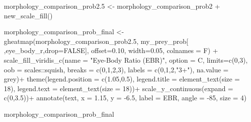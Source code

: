 \documentclass[
]{article}
\newenvironment{Shaded}{\begin{snugshade}}{\end{snugshade}}
\newcommand{\AttributeTok}[1]{\textcolor[rgb]{0.77,0.63,0.00}{#1}}
\newcommand{\ConstantTok}[1]{\textcolor[rgb]{0.00,0.00,0.00}{#1}}
\newcommand{\DecValTok}[1]{\textcolor[rgb]{0.00,0.00,0.81}{#1}}
\newcommand{\FloatTok}[1]{\textcolor[rgb]{0.00,0.00,0.81}{#1}}
\newcommand{\FunctionTok}[1]{\textcolor[rgb]{0.00,0.00,0.00}{#1}}
\newcommand{\NormalTok}[1]{#1}
\newcommand{\OtherTok}[1]{\textcolor[rgb]{0.56,0.35,0.01}{#1}}
\newcommand{\SpecialCharTok}[1]{\textcolor[rgb]{0.00,0.00,0.00}{#1}}
\newcommand{\StringTok}[1]{\textcolor[rgb]{0.31,0.60,0.02}{#1}}
\begin{document}
\begin{Shaded}
\begin{Highlighting}[]
\NormalTok{morphology\_comparison\_prob2}\FloatTok{.5} \OtherTok{\textless{}{-}}\NormalTok{ morphology\_comparison\_prob2 }\SpecialCharTok{+} \FunctionTok{new\_scale\_fill}\NormalTok{()}

\NormalTok{morphology\_comparison\_prob\_final }\OtherTok{\textless{}{-}} \FunctionTok{gheatmap}\NormalTok{(morphology\_comparison\_prob2}\FloatTok{.5}\NormalTok{, }
\NormalTok{                                             my\_prey\_prob[ ,}\StringTok{\textquotesingle{}eye\_body\_r\textquotesingle{}}\NormalTok{,}\AttributeTok{drop=}\ConstantTok{FALSE}\NormalTok{], }
                                             \AttributeTok{offset=}\FloatTok{0.10}\NormalTok{, }\AttributeTok{width=}\FloatTok{0.05}\NormalTok{, }\AttributeTok{colnames =}\NormalTok{ F) }\SpecialCharTok{+}
  \FunctionTok{scale\_fill\_viridis\_c}\NormalTok{(}\AttributeTok{name =} \StringTok{"Eye{-}Body Ratio (EBR)"}\NormalTok{, }
                       \AttributeTok{option =} \StringTok{\textquotesingle{}C\textquotesingle{}}\NormalTok{,}
                       \AttributeTok{limits=}\FunctionTok{c}\NormalTok{(}\DecValTok{0}\NormalTok{,}\DecValTok{3}\NormalTok{), }
                       \AttributeTok{oob =}\NormalTok{ scales}\SpecialCharTok{::}\NormalTok{squish, }
                       \AttributeTok{breaks =} \FunctionTok{c}\NormalTok{(}\DecValTok{0}\NormalTok{,}\DecValTok{1}\NormalTok{,}\DecValTok{2}\NormalTok{,}\DecValTok{3}\NormalTok{),}
                       \AttributeTok{labels =} \FunctionTok{c}\NormalTok{(}\DecValTok{0}\NormalTok{,}\DecValTok{1}\NormalTok{,}\DecValTok{2}\NormalTok{,}\StringTok{"3+"}\NormalTok{), }
                       \AttributeTok{na.value =} \StringTok{\textquotesingle{}grey\textquotesingle{}}\NormalTok{)}\SpecialCharTok{+}
  \FunctionTok{theme}\NormalTok{(}\AttributeTok{legend.position =} \FunctionTok{c}\NormalTok{(}\FloatTok{1.05}\NormalTok{,}\FloatTok{0.5}\NormalTok{),}
        \AttributeTok{legend.title =} \FunctionTok{element\_text}\NormalTok{(}\AttributeTok{size =} \DecValTok{18}\NormalTok{), }
        \AttributeTok{legend.text =} \FunctionTok{element\_text}\NormalTok{(}\AttributeTok{size =} \DecValTok{18}\NormalTok{))}\SpecialCharTok{+}
  \FunctionTok{scale\_y\_continuous}\NormalTok{(}\AttributeTok{expand =} \FunctionTok{c}\NormalTok{(}\DecValTok{0}\NormalTok{,}\FloatTok{3.5}\NormalTok{))}\SpecialCharTok{+}
\FunctionTok{annotate}\NormalTok{(}\StringTok{\textquotesingle{}text\textquotesingle{}}\NormalTok{, }\AttributeTok{x =} \FloatTok{1.15}\NormalTok{, }\AttributeTok{y =} \SpecialCharTok{{-}}\FloatTok{6.5}\NormalTok{, }\AttributeTok{label =} \StringTok{\textquotesingle{}EBR\textquotesingle{}}\NormalTok{, }\AttributeTok{angle =} \SpecialCharTok{{-}}\DecValTok{85}\NormalTok{, }\AttributeTok{size =} \DecValTok{4}\NormalTok{)}

\NormalTok{morphology\_comparison\_prob\_final}
\end{Highlighting}
\end{Shaded}
\end{document}
